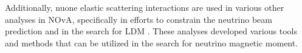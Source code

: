 



Additionally, \gls{nuone} elastic scattering interactions are used in various other analyses in \gls{NOvA}, specifically in efforts to constrain the neutrino beam prediction \cite{NOVA-doc-56383, Nuone_Neutrino2022Poster} and in the search for \gls{LDM} \cite{NOVA-doc-59439}. These analyses developed various tools and methods that can be utilized in the search for neutrino magnetic moment.


